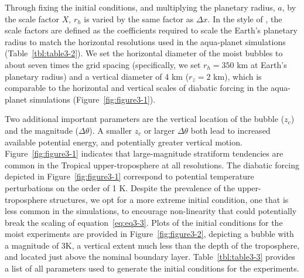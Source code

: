 Through fixing the initial conditions, and multiplying the planetary radius, $a$, by the scale factor $X$, $r_h$ is varied by the same factor as $\Delta x$. In the style of \cite{RM2016GRL}, the scale factors are defined as the coefficients required to scale the Earth’s planetary radius to match the horizontal resolutions used in the aqua-planet simulations (Table~\ref{tbl:table3-2}). We set the horizontal diameter of the moist bubbles to about seven times the grid spacing (specifically, we set $r_h = 350$ km at Earth’s planetary radius) and a vertical diameter of 4 km ($r_z = 2$ km), which is comparable to the horizontal and vertical scales of diabatic forcing in the aqua-planet simulations (Figure~\ref{fig:figure3-1}). 

Two additional important parameters are the vertical location of the bubble ($z_c$) and the magnitude ($\Delta \theta$). A smaller $z_c$ or larger $\Delta \theta$ both lead to increased available potential energy, and potentially greater vertical motion. Figure~\ref{fig:figure3-1} indicates that large-magnitude stratiform tendencies are common in the Tropical upper-troposphere at all resolutions. The diabatic forcing depicted in Figure~\ref{fig:figure3-1} correspond to potential temperature perturbations on the order of 1 K. Despite the prevalence of the upper-troposphere structures, we opt for a more extreme initial condition, one that is less common in the simulations, to encourage non-linearity that could potentially break the scaling of equation~\ref{eq:eq3-3}. Plots of the initial conditions for the moist experiments are provided in Figure~\ref{fig:figure3-2}, depicting a bubble with a magnitude of 3K, a vertical extent much less than the depth of the troposphere, and located just above the nominal boundary layer. Table~\ref{tbl:table3-3} provides a list of all parameters used to generate the initial conditions for the experiments.

